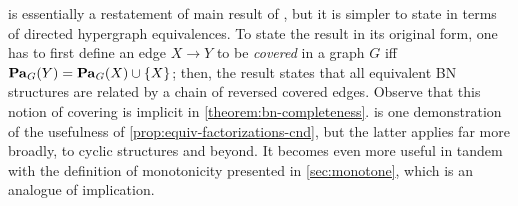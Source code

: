 is essentially a restatement of
main result of \citet{chickering-equiv-bns}, 
but it is simpler to state in terms of directed hypergraph equivalences.
To state the result in its original form, one has to first
define an edge $X \to Y$ to be \emph{covered} in a graph $G$ iff $\mathop{\mathbf{Pa}}\nolimits_G(Y) = \mathop{\mathbf{Pa}}\nolimits_G(X) \cup \{X\}$;
then, the result states that all equivalent BN structures are related by a chain of reversed covered edges. 
Observe that this notion of covering is implicit in \cref{theorem:bn-completeness}.
 is one demonstration of the usefulness of 
\cref{prop:equiv-factorizations-cnd},
but the latter applies far more broadly, to cyclic structures
and beyond. 
It becomes even more useful in tandem
    with the definition of monotonicity presented in \cref{sec:monotone},
    which is an analogue of implication. 
    




